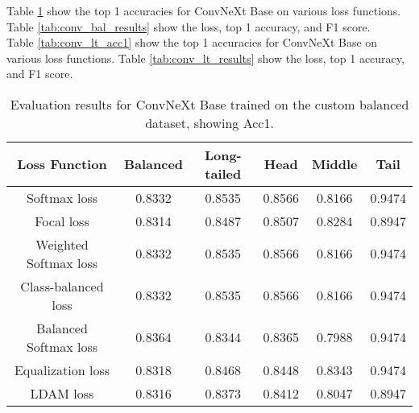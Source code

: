 Table \ref{tab:conv_bal_acc1} show the top 1 accuracies for ConvNeXt Base on various loss functions. Table \ref{tab:conv_bal_results} show the loss, top 1 accuracy, and F1 score.\\

Table \ref{tab:conv_lt_acc1} show the top 1 accuracies for ConvNeXt Base on various loss functions. Table \ref{tab:conv_lt_results} show the loss, top 1 accuracy, and F1 score.

\begin{table}[h!]
    \centering
    \begin{tabular}{cccccc}
        \toprule
        Loss Function & Balanced & Long-tailed & Head & Middle & Tail \\ 
        \midrule
        Softmax loss   & 0.8332 & 0.8535 & 0.8566 & 0.8166 & 0.9474 \\
        Focal loss   & 0.8314 & 0.8487 & 0.8507 & 0.8284 & 0.8947 \\
        Weighted Softmax loss   & 0.8332 & 0.8535 & 0.8566 &  0.8166 & 0.9474 \\
        Class-balanced loss   & 0.8332 & 0.8535 & 0.8566 & 0.8166 & 0.9474 \\
        Balanced Softmax loss   & 0.8364 & 0.8344 & 0.8365 & 0.7988 & 0.9474 \\
        Equalization loss   & 0.8318 & 0.8468 & 0.8448 & 0.8343 & 0.9474 \\
        LDAM loss   & 0.8316 & 0.8373 & 0.8412 & 0.8047 & 0.8947 \\
        \bottomrule
    \end{tabular}
    \caption{Evaluation results for ConvNeXt Base trained on the custom balanced dataset, showing Acc1.}
    \label{tab:conv_bal_acc1}
\end{table}

